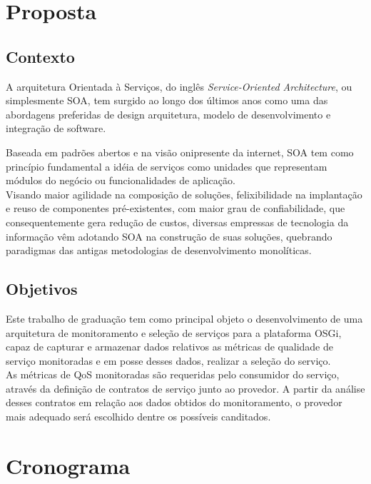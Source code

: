 \chapter{Proposta}
\section{Contexto}
\label{pr:contex}

A arquitetura Orientada à Serviços, do inglês \textit{Service-Oriented Architecture}, ou simplesmente SOA, tem surgido ao longo dos últimos anos como uma das abordagens preferidas de design arquitetura, modelo de desenvolvimento e integração de software.

Baseada em padrões abertos e na visão onipresente da internet, SOA tem como princípio fundamental a idéia de serviços como unidades que representam módulos do negócio ou funcionalidades de aplicação.
\\

Visando maior agilidade na composição de soluções, felixibilidade na implantação e reuso de componentes pré-existentes, com maior grau de confiabilidade, que consequentemente gera redução de custos, diversas empressas de tecnologia da informação vêm adotando SOA na construção de suas soluções, quebrando paradigmas das antigas metodologias de desenvolvimento monolíticas.



\newpage
\section{Objetivos}
\label{pr:objectives}

Este trabalho de graduação tem como principal objeto o desenvolvimento de uma arquitetura de monitoramento e seleção de serviços para a plataforma OSGi, capaz de capturar e armazenar dados relativos as métricas de qualidade de serviço monitoradas e em posse desses dados, realizar a seleção do serviço.
\\

As métricas de QoS monitoradas são requeridas pelo consumidor do serviço, através da definição de contratos de serviço junto ao provedor. A partir da análise desses contratos em relação aos dados obtidos do monitoramento, o provedor mais adequado será escolhido dentre os possíveis canditados.

\newpage
\chapter{Cronograma}
\label{pr:chrono}

